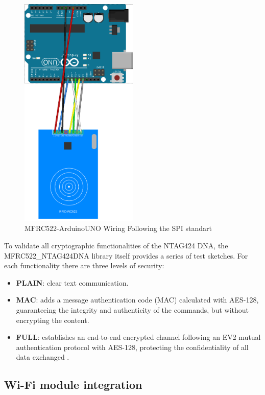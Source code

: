 \begin{figure}[H]
	\centering
	\includegraphics[width=0.5\textwidth]{imaxes/UNOMFRC}
	\caption{MFRC522-ArduinoUNO Wiring Following the SPI standart}
	\label{fig:MFRC-ArduinoUno}
\end{figure}

To validate all cryptographic functionalities of the NTAG424 DNA, the MFRC522\_NTAG424DNA library itself provides a series of test sketches. For each functionality there are three levels of security:

\begin{itemize}
	\item \textbf{PLAIN}: clear text communication.
	\item \textbf{MAC}: adds a message authentication code (MAC) calculated with AES-128, guaranteeing the integrity and authenticity of the commands, but without encrypting the content.
	\item \textbf{FULL}: establishes an end-to-end encrypted channel following an EV2 mutual authentication protocol with AES-128, protecting the confidentiality of all data exchanged \cite{ref42}.
\end{itemize}

\subsection{Wi-Fi module integration}

